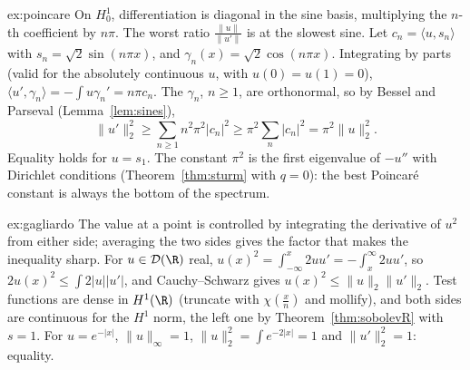 \begin{solution}{ex:poincare}
\idea On $H^1_0$, differentiation is diagonal in the sine basis, multiplying the $n$-th coefficient by $n\pi$. The worst ratio $\frac{\|u\|}{\|u'\|}$ is at the slowest sine.
\writeup Let $c_n=\langle u,s_n\rangle$ with $s_n=\sqrt2\sin(n\pi x)$, and $\gamma_n(x)=\sqrt2\cos(n\pi x)$. Integrating by parts (valid for the absolutely continuous $u$, with $u(0)=u(1)=0$),
$\langle u',\gamma_n\rangle=-\int u\gamma_n'=n\pi c_n$. The $\gamma_n$, $n\ge1$, are orthonormal, so by Bessel and Parseval (Lemma~\ref{lem:sines}),
\[\|u'\|_2^2\ge\sum_{n\ge1}n^2\pi^2|c_n|^2\ge\pi^2\sum_n|c_n|^2=\pi^2\|u\|_2^2.\]
Equality holds for $u=s_1$. The constant $\pi^2$ is the first eigenvalue of $-u''$ with Dirichlet conditions (Theorem~\ref{thm:sturm} with $q=0$): the best Poincar\'e constant is always the bottom of the spectrum.
\end{solution}

\begin{solution}{ex:gagliardo}
\idea The value at a point is controlled by integrating the derivative of $u^2$ from either side; averaging the two sides gives the factor that makes the inequality sharp.
\writeup For $u\in\mathcal D(\R)$ real, $u(x)^2=\int_{-\infty}^x2uu'=-\int_x^\infty2uu'$, so $2u(x)^2\le\int2|u||u'|$, and Cauchy--Schwarz gives $u(x)^2\le\|u\|_2\|u'\|_2$. Test functions are dense in $H^1(\R)$ (truncate with
$\chi(\frac xn)$ and mollify), and both sides are continuous for the $H^1$ norm, the left one by Theorem~\ref{thm:sobolevR} with $s=1$. For $u=e^{-|x|}$, $\|u\|_\infty=1$, $\|u\|_2^2=\int e^{-2|x|}=1$ and $\|u'\|_2^2=1$: equality.
\end{solution}

